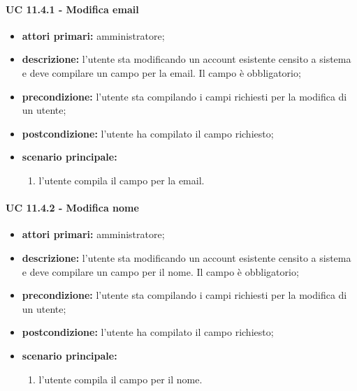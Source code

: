 				\paragraph{UC 11.4.1 - Modifica email}
				\begin{itemize}
					\item \textbf{attori primari:} amministratore;
					\item \textbf{descrizione:} l'utente sta modificando un account esistente censito a sistema e deve compilare un campo per la email. Il campo è obbligatorio;
					\item \textbf{precondizione:} l'utente sta compilando i campi richiesti per la modifica di un utente;
					\item \textbf{postcondizione:} l'utente ha compilato il campo richiesto;
					\item \textbf{scenario principale:}
					\begin{enumerate}
						\item{l'utente compila il campo per la email.}
					\end{enumerate}
				\end{itemize}

				\paragraph{UC 11.4.2 - Modifica nome}
				\begin{itemize}
					\item \textbf{attori primari:} amministratore;
					\item \textbf{descrizione:} l'utente sta modificando un account esistente censito a sistema e deve compilare un campo per il nome. Il campo è obbligatorio;
					\item \textbf{precondizione:} l'utente sta compilando i campi richiesti per la modifica di un utente;
					\item \textbf{postcondizione:} l'utente ha compilato il campo richiesto;
					\item \textbf{scenario principale:}
					\begin{enumerate}
						\item{l'utente compila il campo per il nome.}
					\end{enumerate}
				\end{itemize}

